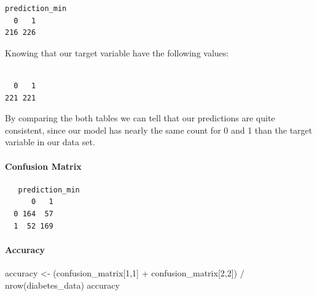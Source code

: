 \documentclass[
]{article}
\newenvironment{Shaded}{\begin{snugshade}}{\end{snugshade}}
\newcommand{\DecValTok}[1]{\textcolor[rgb]{0.00,0.00,0.81}{#1}}
\newcommand{\FunctionTok}[1]{\textcolor[rgb]{0.00,0.00,0.00}{#1}}
\newcommand{\NormalTok}[1]{#1}
\newcommand{\OtherTok}[1]{\textcolor[rgb]{0.56,0.35,0.01}{#1}}
\newcommand{\SpecialCharTok}[1]{\textcolor[rgb]{0.00,0.00,0.00}{#1}}
\begin{document}
\begin{verbatim}
prediction_min
  0   1 
216 226 
\end{verbatim}

Knowing that our target variable have the following values:

\begin{Shaded}
\end{Shaded}

\begin{verbatim}

  0   1 
221 221 
\end{verbatim}

By comparing the both tables we can tell that our predictions are quite
consistent, since our model has nearly the same count for 0 and 1 than
the target variable in our data set.

\hypertarget{confusion-matrix-3}{%
\paragraph{Confusion Matrix}\label{confusion-matrix-3}}

\begin{Shaded}
\end{Shaded}

\begin{verbatim}
   prediction_min
      0   1
  0 164  57
  1  52 169
\end{verbatim}

\hypertarget{accuracy-3}{%
\paragraph{Accuracy}\label{accuracy-3}}

\begin{Shaded}
\begin{Highlighting}[]
\NormalTok{accuracy }\OtherTok{\textless{}{-}}\NormalTok{ (confusion\_matrix[}\DecValTok{1}\NormalTok{,}\DecValTok{1}\NormalTok{] }\SpecialCharTok{+}\NormalTok{ confusion\_matrix[}\DecValTok{2}\NormalTok{,}\DecValTok{2}\NormalTok{]) }\SpecialCharTok{/} \FunctionTok{nrow}\NormalTok{(diabetes\_data)}
\NormalTok{accuracy}
\end{Highlighting}
\end{Shaded}
\end{document}
